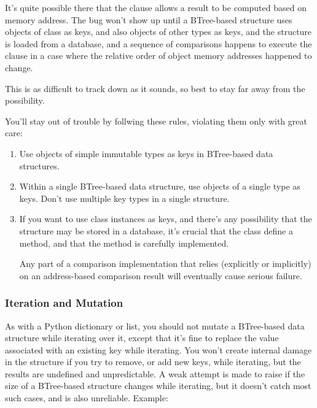 It's quite possible there that the  clause allows
a result to be computed based on memory address.  The bug won't show
up until a BTree-based structure uses objects of class  as
keys, and also objects of other types as keys, and the structure is
loaded from a database, and a sequence of comparisons happens to execute
the  clause in a case where the relative order of object
memory addresses happened to change.

This is as difficult to track down as it sounds, so best to stay far
away from the possibility.

You'll stay out of trouble by follwing these rules, violating them
only with great care:

\begin{enumerate}
\item  Use objects of simple immutable types as keys in
       BTree-based data structures.

\item  Within a single BTree-based data structure, use objects of
       a single type as keys.  Don't use multiple key types in a
       single structure.

\item  If you want to use class instances as keys, and there's
       any possibility that the structure may be stored in a
       database, it's crucial that the class define a
        method, and that the method is
       carefully implemented.

       Any part of a comparison implementation that relies (explicitly
       or implicitly) on an address-based comparison result will
       eventually cause serious failure.
\end{enumerate}


\subsubsection{Iteration and Mutation}

As with a Python dictionary or list, you should not mutate a BTree-based
data structure while iterating over it, except that it's fine to replace
the value associated with an existing key while iterating.  You won't
create internal damage in the structure if you try to remove, or add new
keys, while iterating, but the results are undefined and unpredictable.  A
weak attempt is made to raise  if the size of a
BTree-based structure changes while iterating, but it doesn't catch most
such cases, and is also unreliable.  Example:

